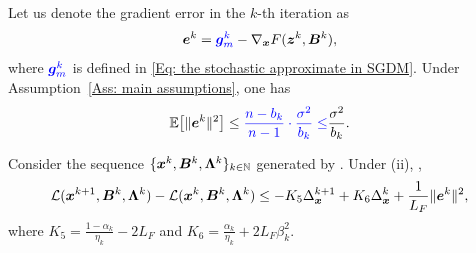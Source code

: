 Let us denote the gradient error in the $k$-th iteration as
\[
\bm{e}^{k} = {\color{blue}\bm{g}_m^{k}} - \nabla_{\bm{x}}F(\bm{z}^{k}, \bm{B}^{k}),
\]where ${\color{blue}\bm{g}_m^k}$ is defined in \eqref{Eq: the stochastic approximate in SGDM}. Under Assumption~\ref{Ass: main assumptions}, one has
\begin{align}
    \label{eq: the gradient error in SGDM}
    \mathbb{E}\!\left[\|\be^k\|^2\right]
    \leq \blue{\frac{n-b_k}{n-1}\cdot\frac{\sigma^2}{b_k}\leq} \frac{\sigma^2}{b_k}.
\end{align}
\begin{lemma}
    \label{app:stom-primal-progress-proof}
\label{Lemma: One-iteration progress of x in SGDM}
    Consider the sequence $\{\bm{x}^k, \bm{B}^k, \bm{\Lambda}^k\}_{k \in \mathbb{N}}$ generated by . Under (ii), \blue{with $\eta_k>0$ and $\alpha_k,\beta_k\in[0,1)$,} ,
    \begin{align}
        \label{Eq: One-iteration progress of x in SGDM}
        \calL (\bx^{k+1}, \bB^{k}, \bLmbd^{k}) - \calL (\bx^{k}, \bB^{k}, \bLmbd^{k})
        \leq -K_5\Delta_{\bx}^{k+1}+K_6\Delta_{\bx}^{k}+ \frac{1}{L_{F}}\|\be^{k}\|^{2},
    \end{align}
    where \(K_5 = \frac{1 - \alpha_{k}}{\eta_{k}}- 2L_F\) and \(K_6 = \frac{\alpha_{k}}{\eta_{k}}+ 2L_F\beta_k^2\).
\end{lemma}


